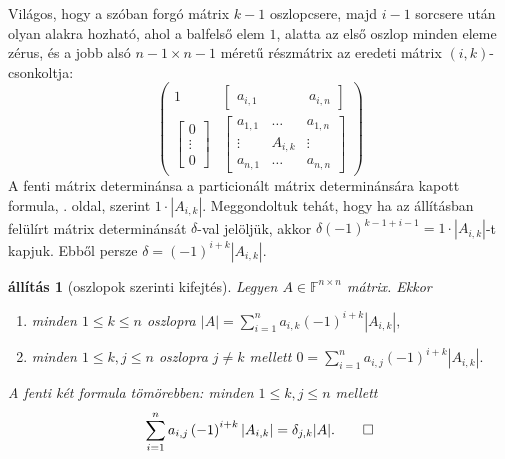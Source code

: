 \documentclass[a4paper, showtrims]{memoir}
\makeatletter
\renewenvironment{proof}[1][\proofname]
    {\par\pushQED{\qed}%
    \normalfont \topsep6\p@\@plus6\p@\relax
    \trivlist
    \item[\hskip\labelsep
        \itshape
    #1\@addpunct{:}]\ignorespaces}
    {\popQED\endtrivlist\@endpefalse}
\theoremstyle{plain}
\newtheorem{proposition}{állítás}[chapter]
\theoremstyle{remark}
\theoremstyle{definition}
\makeatother
\begin{document}
\begin{proof}
	Világos, hogy a szóban forgó mátrix $k-1$ oszlopcsere, 
    majd $i-1$ sorcsere után olyan alakra hozható,
	ahol a balfelső elem $1$, alatta az első oszlop minden eleme zérus,
	és a jobb alsó $n-1\times n-1$ méretű részmátrix az eredeti mátrix $\left( i,k \right)$-csonkoltja:
	\[
		\begin{pmatrix}
			1 & \begin{bmatrix}
				a_{i,1}\, & \phantom{A_{i,k}} & \,a_{i,n}
			\end{bmatrix} \\
			\begin{bmatrix}
				0      \\
				\vdots \\
				0
			\end{bmatrix}
			  &
			\begin{bmatrix}
				a_{1,1} & \dots   & a_{1,n} \\
				\vdots  & A_{i,k} & \vdots  \\
				a_{n,1} & \dots   & a_{n,n}
			\end{bmatrix}
		\end{pmatrix}
	\]
	A fenti mátrix determinánsa a particionált mátrix determinánsára kapott formula,
    \aazt{\pageref{par:particionalt}}. oldal,
	szerint $1\cdot|A_{i,k}|$.
	Meggondoltuk tehát, hogy ha az állításban felülírt mátrix determinánsát $\delta$-val jelöljük,
	akkor  $\delta\left( -1 \right)^{k-1+i-1}=1\cdot|A_{i,k}|$-t kapjuk.
	Ebből persze
	\begin{math}
		\delta
		=\left( -1 \right)^{i+k}|A_{i,k}|.
	\end{math}
\end{proof}
\begin{proposition}[oszlopok szerinti kifejtés]
	Legyen $A\in\mathbb{F}^{n\times n}$ mátrix.
	Ekkor
	\begin{enumerate}
		\item minden $1\leq k\leq n$ oszlopra
		      \(
		      |A|=
		      \sum_{i=1}^na_{i,k}\left( -1 \right)^{i+k}|A_{i,k}|,
		      \)
		\item minden $1\leq k,j\leq n$ oszlopra $j\neq k$ mellett
		      \(
		      0=
		      \sum_{i=1}^na_{i,j}\left( -1 \right)^{i+k}|A_{i,k}|.
		      \)
	\end{enumerate}
	A fenti két formula tömörebben: minden $1\leq k,j\leq n$ mellett
	\[
		\sum_{i=1}^na_{i,j}\left( -1 \right)^{i+k}|A_{i,k}|
		=
		\delta_{j,k}|A|.\qedhere
	\]
\end{proposition}
\end{document}
